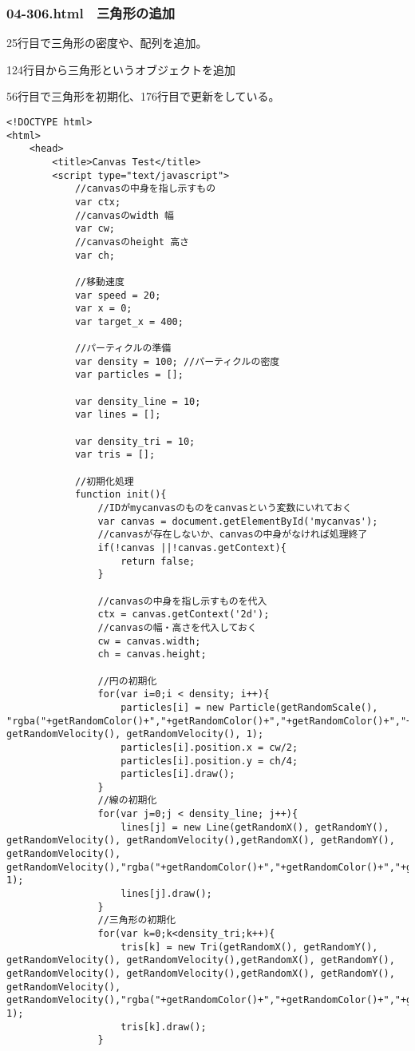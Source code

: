 \documentclass[mingoth,11pt,a4j,uplatex]{jsarticle}
\begin{document}
\subsubsection{04-306.html　三角形の追加}
25行目で三角形の密度や、配列を追加。

124行目から三角形というオブジェクトを追加

56行目で三角形を初期化、176行目で更新をしている。

\begin{lstlisting}[caption=三角形の追加]
<!DOCTYPE html>
<html>
	<head>
		<title>Canvas Test</title>
		<script type="text/javascript">
			//canvasの中身を指し示すもの
			var ctx;
			//canvasのwidth 幅
			var cw;
			//canvasのheight 高さ
			var ch;
			
			//移動速度
			var speed = 20;
			var x = 0;
			var target_x = 400;
			
			//パーティクルの準備
			var density = 100; //パーティクルの密度
			var particles = [];
			
			var density_line = 10;
			var lines = [];
			
			var density_tri = 10;
			var tris = [];
			
			//初期化処理
			function init(){
				//IDがmycanvasのものをcanvasという変数にいれておく
				var canvas = document.getElementById('mycanvas');
				//canvasが存在しないか、canvasの中身がなければ処理終了
				if(!canvas ||!canvas.getContext){
					return false;
				}
				
				//canvasの中身を指し示すものを代入
				ctx = canvas.getContext('2d');
				//canvasの幅・高さを代入しておく
				cw = canvas.width;
				ch = canvas.height;
				
				//円の初期化
				for(var i=0;i < density; i++){
					particles[i] = new Particle(getRandomScale(), "rgba("+getRandomColor()+","+getRandomColor()+","+getRandomColor()+","+getRandomAlpha()+")", getRandomVelocity(), getRandomVelocity(), 1);
					particles[i].position.x = cw/2;
					particles[i].position.y = ch/4;
					particles[i].draw();			
				}
				//線の初期化
				for(var j=0;j < density_line; j++){
					lines[j] = new Line(getRandomX(), getRandomY(), getRandomVelocity(), getRandomVelocity(),getRandomX(), getRandomY(), getRandomVelocity(), getRandomVelocity(),"rgba("+getRandomColor()+","+getRandomColor()+","+getRandomColor()+","+getRandomAlpha()+")",getRandomWidth(), 1);
					lines[j].draw();
				}
				//三角形の初期化
				for(var k=0;k<density_tri;k++){
					tris[k] = new Tri(getRandomX(), getRandomY(), getRandomVelocity(), getRandomVelocity(),getRandomX(), getRandomY(), getRandomVelocity(), getRandomVelocity(),getRandomX(), getRandomY(), getRandomVelocity(), getRandomVelocity(),"rgba("+getRandomColor()+","+getRandomColor()+","+getRandomColor()+","+getRandomAlpha()+")",getRandomWidth(), 1);
					tris[k].draw();
				}
				

\end{lstlisting}
\end{document}
